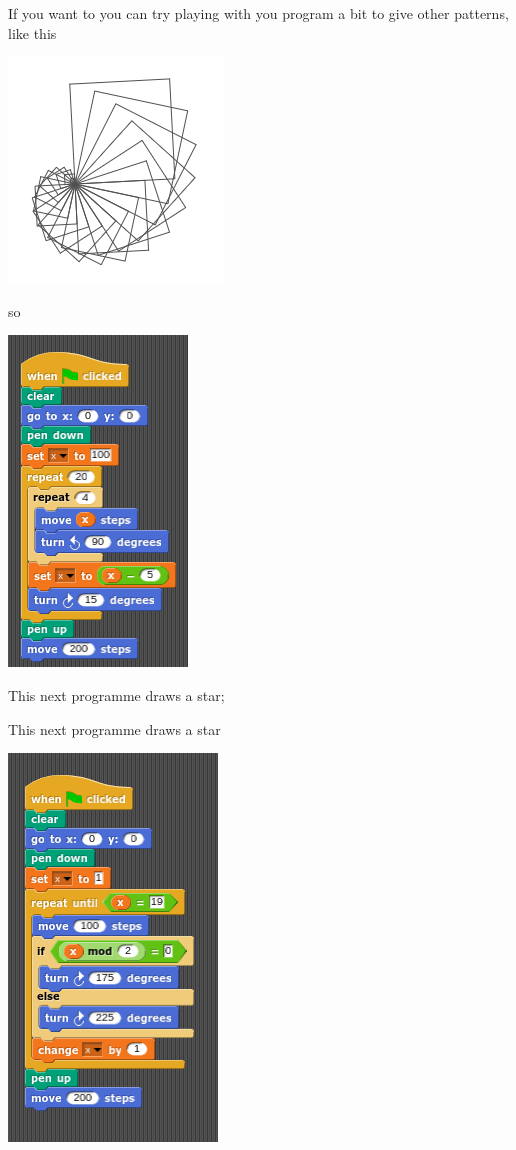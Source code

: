 \documentclass[11pt,a4paper]{scrartcl}
\begin{document}
If you want to you can try playing with you program a bit to give other patterns, like this
\begin{center}
\includegraphics{squares_spiral_pic.png}
\end{center}
so 
\begin{center}
\includegraphics{squares_spiral.png}
\end{center}

This next programme draws a star;

This next programme draws a star
\begin{center}
\includegraphics{star.png}
\end{center}
\end{document}
